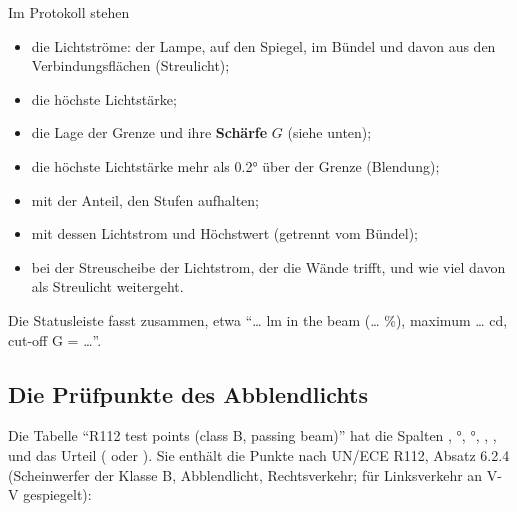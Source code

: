 Im Protokoll stehen
\begin{itemize}
  \item die Lichtströme: der Lampe, auf den Spiegel, im Bündel und davon aus den Verbindungsflächen
    (Streulicht);
  \item die höchste Lichtstärke;
  \item die Lage der Grenze und ihre \textbf{Schärfe} $G$ (siehe unten);
  \item die höchste Lichtstärke mehr als \ang{0.2} über der Grenze (Blendung);
  \item mit  der Anteil, den Stufen aufhalten;
  \item mit  dessen Lichtstrom und Höchstwert (getrennt vom Bündel);
  \item bei der Streuscheibe der Lichtstrom, der die Wände trifft, und wie viel davon als Streulicht
    weitergeht.
\end{itemize}

Die Statusleiste fasst zusammen, etwa \enquote{… lm in the beam (… \%), maximum … cd, cut-off G =
…}.

\subsection{Die Prüfpunkte des Abblendlichts}

Die Tabelle \enquote{R112 test points (class B, passing beam)} hat die Spalten ,
\si{\degree}, \si{\degree}, , ,
 und das Urteil ( oder ). Sie enthält die Punkte nach UN/ECE
R112, Absatz 6.2.4 (Scheinwerfer der Klasse B, Abblendlicht, Rechtsverkehr; für Linksverkehr an
V-V gespiegelt):

